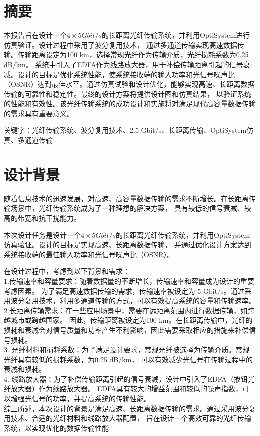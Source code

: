 \documentclass[12pt]{article}
\begin{document}
\section{摘要}
本报告旨在设计一个$4\times 5 Gbit/s$的长距离光纤传输系统，并利用OptiSystem进行仿真验证。设计过程中采用了波分复用技术，
通过多通道传输实现高速数据传输。传输距离设定为100 km，选择常规光纤作为传输介质，光纤损耗系数为0.25 dB/km。
系统中引入了EDFA作为线路放大器，用于补偿传输距离引起的信号衰减。设计的目标是优化系统性能，使系统接收端的输入功率和光信号噪声比
（OSNR）达到最佳水平。通过仿真试验和设计优化，能够实现高速、长距离数据传输的可靠性和稳定性。最终的设计方案将提供设计图和仿真结果，
以验证系统的性能和有效性。该光纤传输系统的成功设计和实施将对满足现代高容量数据传输的需求具有重要意义。

关键字：光纤传输系统、波分复用技术、2.5 Gbit/s、长距离传输、OptiSystem仿真、多通道传输
\clearpage     %
\section{设计背景}
随着信息技术的迅速发展，对高速、高容量数据传输的需求不断增长。在长距离传输场景中，光纤传输系统成为了一种理想的解决方案，
具有较低的信号衰减、较高的带宽和抗干扰能力。

本次设计任务是设计一个$4\times 5 Gbit/s$的长距离光纤传输系统，并利用OptiSystem仿真验证。设计的目标是实现高速、长距离数据传输，
并通过优化设计方案达到系统接收端的最佳输入功率和光信号噪声比（OSNR）。

在设计过程中，考虑到以下背景和需求：
\\
1.传输速率和容量要求：随着数据量的不断增长，传输速率和容量成为设计的重要考虑因素。
为了满足高速数据传输的需求，传输速率被设定为 5 Gbit/s。通过采用波分复用技术，利用多通道传输的方式，可以有效提高系统的容量和传输速率。
\\
2.长距离传输需求：在一些应用场景中，需要在远距离范围内进行数据传输，如跨越城市或跨越国家。
因此，传输距离被设定为100 km。在长距离传输中，光纤的损耗和衰减会对信号质量和功率产生不利影响，因此需要采取相应的措施来补偿信号损耗。
\\
3.	光纤材料和损耗系数：为了满足设计要求，常规光纤被选择为传输介质。常规光纤具有较低的损耗系数，为0.25 dB/km，
可以有效减少光信号在传输过程中的衰减和损耗。
\\
4.	线路放大器：为了补偿传输距离引起的信号衰减，设计中引入了EDFA（掺铒光纤放大器）作为线路放大器。
EDFA具有较大的增益范围和较低的噪声指数，可以增强光信号的功率，并提高系统的传输性能。
\\
综上所述，本次设计的背景是满足高速、长距离数据传输的需求。通过采用波分复用技术、合适的光纤材料和线路放大器配置，
旨在设计一个高效可靠的光纤传输系统，以实现优化的数据传输性能
\end{document}

